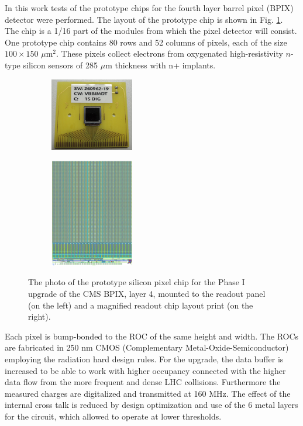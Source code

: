 In this work tests of the prototype chips for the fourth layer barrel pixel (BPIX) detector were performed. The layout of the prototype chip is shown 
in Fig. \ref{fig:prototype}. The chip is a 1/16 part of the modules from which the pixel detector will consist. 
One prototype chip contains 80 rows and 52 columns of pixels, each of the size $100\times150$ $\mu$m$^{2}$.
These pixels collect electrons from oxygenated high-resistivity $n$-type silicon sensors of 285 $\mu$m thickness with n+ implants. 

\begin{figure}[t]
 \centering
 \begin{subfigure}
  \centering
  \includegraphics[width=0.4\textwidth]{021_pixel_upgrade/plots/prototype_chip_photo.png}
 \end{subfigure}
 \begin{subfigure}
  \centering
  \includegraphics[width=0.4\textwidth]{021_pixel_upgrade/plots/prototype_chip.png}
 \end{subfigure}
 \caption{The photo of the prototype silicon pixel chip for the Phase I upgrade of the CMS BPIX, layer 4, mounted to the readout panel (on the left)
 and a magnified readout chip layout print (on the right).}
 \label{fig:prototype}
\end{figure}

Each pixel is bump-bonded to the ROC of the same height and width. The ROCs are fabricated in 250 nm CMOS (Complementary Metal-Oxide-Semiconductor)
employing the radiation hard design rules.
For the upgrade, the data buffer is increased to be able to work with higher occupancy connected with the higher data flow from the more frequent 
and dense LHC collisions. Furthermore the measured charges are digitalized and transmitted at 160 MHz. The effect of the internal cross talk is reduced
by design optimization and use of the 6 metal layers for the circuit, which allowed to operate at lower thresholds.

